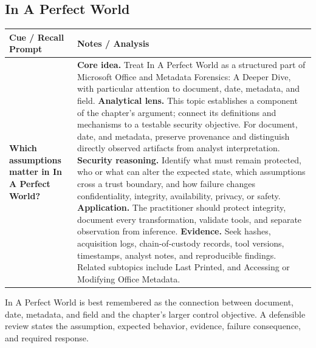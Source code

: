 \documentclass[11pt]{article}
\newcommand{\CornellHeader}{%
\rowcolor{Navy}\color{white}\bfseries Cue / Recall Prompt & \color{white}\bfseries Notes / Analysis\\\hline}
\newcommand{\CornellRow}[2]{%
\cellcolor{CueGray}\RaggedRight\textbf{#1} & \RaggedRight #2\\\hline}
\begin{document}
\subsection*{In A Perfect World}
\begin{longtable}{>{\RaggedRight\arraybackslash}p{}|>{\RaggedRight\arraybackslash}p{}}
\CornellHeader
\CornellRow{Which assumptions matter in In A Perfect World?}{\textbf{Core idea.} Treat In A Perfect World as a structured part of Microsoft Office and Metadata Forensics: A Deeper Dive, with particular attention to document, date, metadata, and field. \textbf{Analytical lens.} This topic establishes a component of the chapter's argument; connect its definitions and mechanisms to a testable security objective. For document, date, and metadata, preserve provenance and distinguish directly observed artifacts from analyst interpretation. \textbf{Security reasoning.} Identify what must remain protected, who or what can alter the expected state, which assumptions cross a trust boundary, and how failure changes confidentiality, integrity, availability, privacy, or safety. \textbf{Application.} The practitioner should protect integrity, document every transformation, validate tools, and separate observation from inference. \textbf{Evidence.} Seek hashes, acquisition logs, chain-of-custody records, tool versions, timestamps, analyst notes, and reproducible findings. Related subtopics include Last Printed, and Accessing or Modifying Office Metadata.}
\end{longtable}
\begin{topicsummary}
In A Perfect World is best remembered as the connection between document, date, metadata, and field and the chapter's larger control objective. A defensible review states the assumption, expected behavior, evidence, failure consequence, and required response.
\end{topicsummary}
\end{document}
